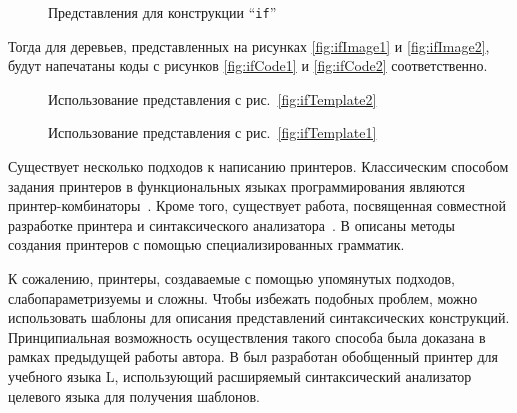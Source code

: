 \begin{figure}[h!]
	\subfloat[]{
		
		\label{fig:ifTemplate2}	
	}
	\quad
	\subfloat[]{
		
		\label{fig:ifTemplate1}	
	}
	\caption{Представления для конструкции “\lstinline{if}”}
\end{figure}


Тогда для деревьев, представленных на рисунках
\ref{fig:ifImage1} и \ref{fig:ifImage2}, будут напечатаны коды с
рисунков \ref{fig:ifCode1} и \ref{fig:ifCode2} соответственно.

\begin{figure}[h!]
	\subfloat[]{
		\centering
		\texttt{[image: if1]}
		\label{fig:ifImage1}
	}
	\quad
	\subfloat[]{
		\centering
		
		\label{fig:ifCode1}	
	}

	\caption{Использование представления с рис.~\ref{fig:ifTemplate2}}
\end{figure}

\begin{figure}[h!]
	\subfloat[]{
		\centering
		\texttt{[image: if2]}
		\label{fig:ifImage2}
	}
	\quad
	\subfloat[]{
		\centering
		
		\label{fig:ifCode2}	
	}

	\caption{Использование представления с рис.~\ref{fig:ifTemplate1}}
\end{figure}

Существует несколько подходов к написанию принтеров.
Классическим способом задания принтеров в функциональных языках
программирования являются
принтер-комбинаторы~\cite{wadler, swierstra, swierstraChitil,
swierstra04, hughes, peytonJones, kiselyov, chitil, swiComb}.
Кроме того, существует работа, посвященная совместной разработке
принтера и синтаксического анализатора~\cite{rendelInvert}.
В \cite{jongeEveryOccasion, jongeReengine, brandBox} описаны методы
создания принтеров с помощью специализированных грамматик.

К сожалению, принтеры, создаваемые с помощью упомянутых подходов,
слабопараметризуемы и сложны. Чтобы избежать подобных проблем,
можно использовать шаблоны для описания представлений синтаксических
конструкций. Принципиальная возможность осуществления такого способа была
доказана в рамках предыдущей работы
автора. В \cite{myCoursePaper} был разработан
обобщенный принтер для учебного языка L, использующий расширяемый
синтаксический анализатор целевого языка для получения шаблонов.

